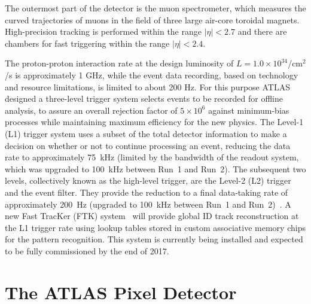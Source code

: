The outermost part of the detector is the muon spectrometer, which measures the curved trajectories of muons in the field of three large air-core toroidal magnets. High-precision tracking is performed within the range $|\eta| < 2.7$ and there are chambers for fast triggering within the range $|\eta| < 2.4$.

The proton-proton interaction rate at the design luminosity of $L=1.0\times10^{34}$/cm$^{2}$/s 
is approximately 1 GHz, while the event data recording, based on technology and resource limitations, 
is limited to about 200 Hz. For this purpose ATLAS designed 
a three-level trigger system selects events to be recorded for offline analysis, to assure 
an overall rejection factor of $5\times10^{6}$ against minimum-bias processes while maintaining 
maximum efficiency for the new physics. 
The Level-1 (L1) trigger system uses a subset of the total detector information to make a decision on 
whether or not to continue processing an event, reducing the data rate to approximately 75~kHz (limited 
by the bandwidth of the readout system, which was upgraded to 100~kHz between Run~1 and Run~2). 
The subsequent two levels, 
collectively known as the high-level trigger, are the Level-2 (L2) trigger and the event filter. They provide 
the reduction to a final data-taking rate of approximately 200~Hz (upgraded to 100~kHz between 
Run~1 and Run~2)~\cite{AtlasTrigger2015}. A new Fast TracKer (FTK) system~\cite{FTKTDR} will 
provide global ID track reconstruction at the L1 trigger rate
using lookup tables stored in custom associative memory chips for the pattern recognition.  This 
system is currently being installed and expected to
be fully commissioned by the end of 2017.



\section{The ATLAS Pixel Detector}
\label{sec:ATLASPixelDetector}

